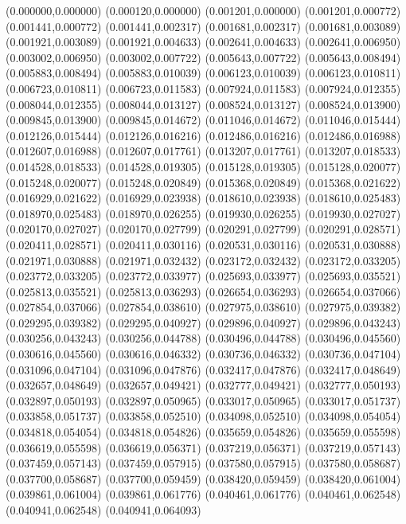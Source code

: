 (0.000000,0.000000)
(0.000120,0.000000)
(0.001201,0.000000)
(0.001201,0.000772)
(0.001441,0.000772)
(0.001441,0.002317)
(0.001681,0.002317)
(0.001681,0.003089)
(0.001921,0.003089)
(0.001921,0.004633)
(0.002641,0.004633)
(0.002641,0.006950)
(0.003002,0.006950)
(0.003002,0.007722)
(0.005643,0.007722)
(0.005643,0.008494)
(0.005883,0.008494)
(0.005883,0.010039)
(0.006123,0.010039)
(0.006123,0.010811)
(0.006723,0.010811)
(0.006723,0.011583)
(0.007924,0.011583)
(0.007924,0.012355)
(0.008044,0.012355)
(0.008044,0.013127)
(0.008524,0.013127)
(0.008524,0.013900)
(0.009845,0.013900)
(0.009845,0.014672)
(0.011046,0.014672)
(0.011046,0.015444)
(0.012126,0.015444)
(0.012126,0.016216)
(0.012486,0.016216)
(0.012486,0.016988)
(0.012607,0.016988)
(0.012607,0.017761)
(0.013207,0.017761)
(0.013207,0.018533)
(0.014528,0.018533)
(0.014528,0.019305)
(0.015128,0.019305)
(0.015128,0.020077)
(0.015248,0.020077)
(0.015248,0.020849)
(0.015368,0.020849)
(0.015368,0.021622)
(0.016929,0.021622)
(0.016929,0.023938)
(0.018610,0.023938)
(0.018610,0.025483)
(0.018970,0.025483)
(0.018970,0.026255)
(0.019930,0.026255)
(0.019930,0.027027)
(0.020170,0.027027)
(0.020170,0.027799)
(0.020291,0.027799)
(0.020291,0.028571)
(0.020411,0.028571)
(0.020411,0.030116)
(0.020531,0.030116)
(0.020531,0.030888)
(0.021971,0.030888)
(0.021971,0.032432)
(0.023172,0.032432)
(0.023172,0.033205)
(0.023772,0.033205)
(0.023772,0.033977)
(0.025693,0.033977)
(0.025693,0.035521)
(0.025813,0.035521)
(0.025813,0.036293)
(0.026654,0.036293)
(0.026654,0.037066)
(0.027854,0.037066)
(0.027854,0.038610)
(0.027975,0.038610)
(0.027975,0.039382)
(0.029295,0.039382)
(0.029295,0.040927)
(0.029896,0.040927)
(0.029896,0.043243)
(0.030256,0.043243)
(0.030256,0.044788)
(0.030496,0.044788)
(0.030496,0.045560)
(0.030616,0.045560)
(0.030616,0.046332)
(0.030736,0.046332)
(0.030736,0.047104)
(0.031096,0.047104)
(0.031096,0.047876)
(0.032417,0.047876)
(0.032417,0.048649)
(0.032657,0.048649)
(0.032657,0.049421)
(0.032777,0.049421)
(0.032777,0.050193)
(0.032897,0.050193)
(0.032897,0.050965)
(0.033017,0.050965)
(0.033017,0.051737)
(0.033858,0.051737)
(0.033858,0.052510)
(0.034098,0.052510)
(0.034098,0.054054)
(0.034818,0.054054)
(0.034818,0.054826)
(0.035659,0.054826)
(0.035659,0.055598)
(0.036619,0.055598)
(0.036619,0.056371)
(0.037219,0.056371)
(0.037219,0.057143)
(0.037459,0.057143)
(0.037459,0.057915)
(0.037580,0.057915)
(0.037580,0.058687)
(0.037700,0.058687)
(0.037700,0.059459)
(0.038420,0.059459)
(0.038420,0.061004)
(0.039861,0.061004)
(0.039861,0.061776)
(0.040461,0.061776)
(0.040461,0.062548)
(0.040941,0.062548)
(0.040941,0.064093)
